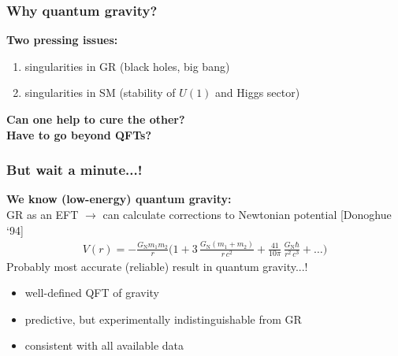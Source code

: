 \documentclass[]{beamer}  %
\newcommand\GNewton{ G_{\scriptscriptstyle{\mathrm{N}}}{} }
\begin{document}
\addtocounter{framenumber}{-1}
\begin{frame}
  \frametitle{Why quantum gravity?}
  \textbf{Two pressing issues:}
  \begin{enumerate}
    \item singularities in GR (black holes, big bang)
      \hspace{2cm}
    \item singularities in SM (stability of $U(1)$ and Higgs sector)
  \end{enumerate}
  \vfill
  \begin{center}
    \fontsize{12pt}{7.2}\selectfont
    \textbf{ Can one help to cure the other? } \\[15pt]
    \textbf{ Have to go beyond QFTs? }
  \end{center}
\end{frame}



\begin{frame}
  \frametitle{But wait a minute...!}
  \textbf{We know (low-energy) quantum gravity:}\\[5pt]
  GR as an EFT $\rightarrow$ can calculate corrections to Newtonian potential [Donoghue `94]
  \begin{align*}
    \boxed{
      V(r) = -\frac{\GNewton m_1 m_2}{r}
      \bigg(
        1
        + 3 \, \frac{\GNewton (m_1 + m_2)}{r \, c^2}
        + \frac{41}{10 \pi} \, \frac{\GNewton \hbar}{r^2 \, c^3}
        + \dots
      \bigg)
    }
  \end{align*}
  \hfill Probably most accurate (reliable) result in quantum gravity...!
  \pause
  \vfill
  \begin{itemize}
    \item well-defined QFT of gravity\\[5pt]
    \item predictive, but experimentally indistinguishable from GR\\[5pt]
    \item consistent with all available data
  \end{itemize}
\end{frame}
\end{document}
